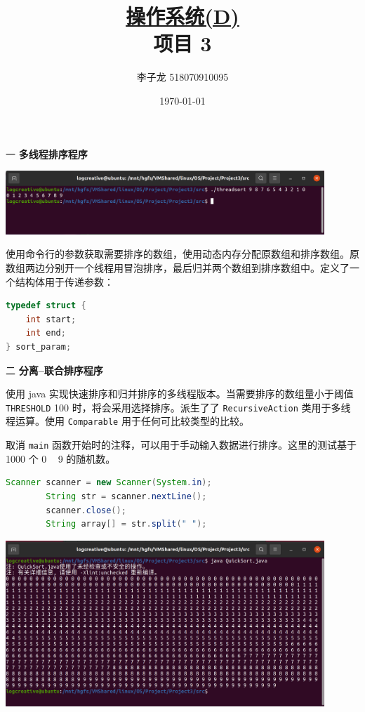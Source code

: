 \documentclass[12pt,a4paper]{article}
\newenvironment{problems}{\begin{list}{}{\renewcommand{\makelabel}[1]{\textbf{##1}\hfil}}}{\end{list}}
\providecommand{\code}[2]{}
\begin{document}
\title{\normalsize \underline{操作系统(D)}\\\LARGE 项目 3}
\author{李子龙 518070910095}
\date{\today}
\maketitle

\begin{problems}
    \item[一] \textbf{多线程排序程序}
    
    \includegraphics[width=0.9\textwidth]{threadsort.png}

    使用命令行的参数获取需要排序的数组，使用动态内存分配原数组和排序数组。原数组两边分别开一个线程用冒泡排序，最后归并两个数组到排序数组中。定义了一个结构体用于传递参数：
    \begin{lstlisting}[language=c]
typedef struct {
    int start;
    int end;
} sort_param;
    \end{lstlisting}

    \code{src/threadsort.c}{c}

    \item[二] \textbf{分离--联合排序程序} 
    
    使用 java 实现快速排序和归并排序的多线程版本。当需要排序的数组量小于阈值 \verb"THRESHOLD" 100 时，将会采用选择排序。派生了了 \verb"RecursiveAction" 类用于多线程运算。使用 \verb"Comparable" 用于任何可比较类型的比较。

    取消 \verb"main" 函数开始时的注释，可以用于手动输入数据进行排序。这里的测试基于 1000 个 0 ~ 9 的随机数。
    \begin{lstlisting}[language=java]
        Scanner scanner = new Scanner(System.in);
        String str = scanner.nextLine();
        scanner.close();
        String array[] = str.split(" ");
    \end{lstlisting}

    \includegraphics[width=0.9\textwidth]{quicksort.png}


\end{problems}
\end{document}
